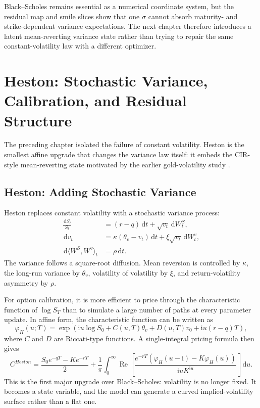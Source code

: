 \documentclass[a4paper,10pt,titlepage,oneside,openany]{book}
\theoremstyle{plain}
\theoremstyle{definition}
\theoremstyle{remark}
\newcommand{\dd}{\,\mathrm{d}}
\newcommand{\ii}{\mathrm{i}}
\begin{document}
Black--Scholes remains essential as a numerical coordinate system, but the residual map and smile slices show that one \(\sigma\) cannot absorb maturity- and strike-dependent variance expectations. The next chapter therefore introduces a latent mean-reverting variance state rather than trying to repair the same constant-volatility law with a different optimizer.

\chapter{Heston: Stochastic Variance, Calibration, and Residual Structure}

The preceding chapter isolated the failure of constant volatility. Heston is the smallest affine upgrade that changes the variance law itself: it embeds the CIR-style mean-reverting state motivated by the earlier gold-volatility study \cite{BarrickArticle6}.

\section{Heston: Adding Stochastic Variance}

Heston replaces constant volatility with a stochastic variance process:
\begin{align}
    \frac{\dd S_t}{S_t} &= (r-q)\dd t+\sqrt{v_t}\dd W_t^S,\\
    \dd v_t &= \kappa(\theta_v-v_t)\dd t+\xi\sqrt{v_t}\dd W_t^v,\\
    \dd\langle W^S,W^v\rangle_t &= \rho\dd t.
\end{align}
The variance follows a square-root diffusion. Mean reversion is controlled by \(\kappa\), the long-run variance by \(\theta_v\), volatility of volatility by \(\xi\), and return-volatility asymmetry by \(\rho\).

For option calibration, it is more efficient to price through the characteristic function of \(\log S_T\) than to simulate a large number of paths at every parameter update. In affine form, the characteristic function can be written as
\begin{equation}
    \varphi_H(u;T)
    =
    \exp\left(
        \ii u\log S_0 + C(u,T)\theta_v + D(u,T)v_0 + \ii u(r-q)T
    \right),
    \label{eq:heston-cf}
\end{equation}
where \(C\) and \(D\) are Riccati-type functions. A single-integral pricing formula then gives
\begin{equation}
    C^{Heston}
    =
    \frac{S_0e^{-qT}-Ke^{-rT}}{2}
    +
    \frac{1}{\pi}\int_0^\infty
    \operatorname{Re}
    \left[
        \frac{e^{-rT}\left(\varphi_H(u-\ii)-K\varphi_H(u)\right)}
        {\ii u K^{\ii u}}
    \right]\dd u.
    \label{eq:single-integral}
\end{equation}
This is the first major upgrade over Black--Scholes: volatility is no longer fixed. It becomes a state variable, and the model can generate a curved implied-volatility surface rather than a flat one.
\end{document}
